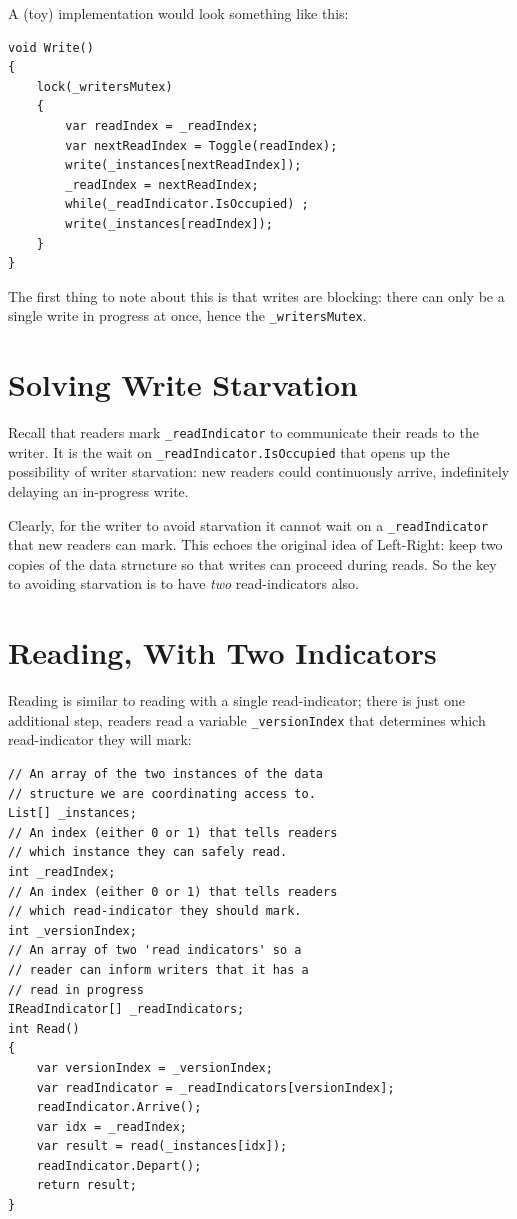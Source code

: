 \documentclass[11pt]{article}
\begin{document}
A (toy) implementation would look something like this:

\begin{verbatim}
void Write()
{
    lock(_writersMutex)
    {
        var readIndex = _readIndex;
        var nextReadIndex = Toggle(readIndex);
        write(_instances[nextReadIndex]);
        _readIndex = nextReadIndex;
        while(_readIndicator.IsOccupied) ;
        write(_instances[readIndex]);
    }
}
\end{verbatim}

The first thing to note about this is that writes are blocking: there can only be a single write in progress at once, hence the \texttt{\_writersMutex}.

\section{Solving Write Starvation}

Recall that readers mark \texttt{\_readIndicator} to communicate their reads to the writer. It is the wait on \texttt{\_readIndicator.IsOccupied} that opens up the possibility of writer starvation: new readers could continuously arrive, indefinitely delaying an in-progress write.

Clearly, for the writer to avoid starvation it cannot wait on a \texttt{\_readIndicator} that new readers can mark. This echoes the original idea of Left-Right: keep two copies of the data structure so that writes can proceed during reads. So the key to avoiding starvation is to have \emph{two} read-indicators also.

\section{Reading, With Two Indicators}

Reading is similar to reading with a single read-indicator; there is just one additional step, readers read a variable \texttt{\_versionIndex} that determines which read-indicator they will mark:

\begin{verbatim}
// An array of the two instances of the data
// structure we are coordinating access to.
List[] _instances;
// An index (either 0 or 1) that tells readers
// which instance they can safely read.
int _readIndex;
// An index (either 0 or 1) that tells readers
// which read-indicator they should mark.
int _versionIndex;
// An array of two 'read indicators' so a
// reader can inform writers that it has a
// read in progress
IReadIndicator[] _readIndicators;
int Read()
{
    var versionIndex = _versionIndex;
    var readIndicator = _readIndicators[versionIndex];
    readIndicator.Arrive();
    var idx = _readIndex;
    var result = read(_instances[idx]);
    readIndicator.Depart();
    return result;
}
\end{verbatim}
\end{document}
